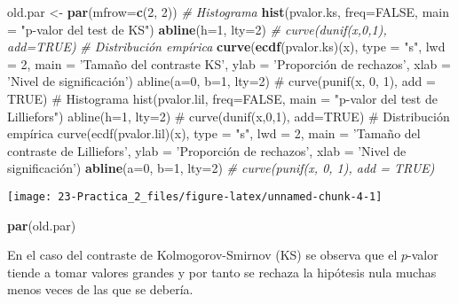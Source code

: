 \documentclass[
]{book}
\newenvironment{Shaded}{\begin{snugshade}}{\end{snugshade}}
\newcommand{\CommentTok}[1]{\textcolor[rgb]{0.56,0.35,0.01}{\textit{#1}}}
\newcommand{\DataTypeTok}[1]{\textcolor[rgb]{0.13,0.29,0.53}{#1}}
\newcommand{\DecValTok}[1]{\textcolor[rgb]{0.00,0.00,0.81}{#1}}
\newcommand{\KeywordTok}[1]{\textcolor[rgb]{0.13,0.29,0.53}{\textbf{#1}}}
\newcommand{\NormalTok}[1]{#1}
\newcommand{\OtherTok}[1]{\textcolor[rgb]{0.56,0.35,0.01}{#1}}
\newcommand{\StringTok}[1]{\textcolor[rgb]{0.31,0.60,0.02}{#1}}
\theoremstyle{definition}
\theoremstyle{definition}
\theoremstyle{definition}
\theoremstyle{remark}
\begin{document}
\begin{Shaded}
\begin{Highlighting}[]
\NormalTok{old.par <-}\StringTok{ }\KeywordTok{par}\NormalTok{(}\DataTypeTok{mfrow=}\KeywordTok{c}\NormalTok{(}\DecValTok{2}\NormalTok{, }\DecValTok{2}\NormalTok{))}
\CommentTok{# Histograma}
\KeywordTok{hist}\NormalTok{(pvalor.ks, }\DataTypeTok{freq=}\OtherTok{FALSE}\NormalTok{, }\DataTypeTok{main =} \StringTok{"p-valor del test de KS"}\NormalTok{)}
\KeywordTok{abline}\NormalTok{(}\DataTypeTok{h=}\DecValTok{1}\NormalTok{, }\DataTypeTok{lty=}\DecValTok{2}\NormalTok{)   }\CommentTok{# curve(dunif(x,0,1), add=TRUE)}
\CommentTok{# Distribución empírica}
\KeywordTok{curve}\NormalTok{(}\KeywordTok{ecdf}\NormalTok{(pvalor.ks)(x), }\DataTypeTok{type =} \StringTok{"s"}\NormalTok{, }\DataTypeTok{lwd =} \DecValTok{2}\NormalTok{, }
      \DataTypeTok{main =} \StringTok{'Tamaño del contraste KS'}\NormalTok{, }\DataTypeTok{ylab =} \StringTok{'Proporción de rechazos'}\NormalTok{, }
      \DataTypeTok{xlab =} \StringTok{'Nivel de significación')}
\StringTok{abline(a=0, b=1, lty=2)   # curve(punif(x, 0, 1), add = TRUE)}
\StringTok{# Histograma}
\StringTok{hist(pvalor.lil, freq=FALSE, main = "p-valor del test de Lilliefors")}
\StringTok{abline(h=1, lty=2)   # curve(dunif(x,0,1), add=TRUE)}
\StringTok{# Distribución empírica}
\StringTok{curve(ecdf(pvalor.lil)(x), type = "s", lwd = 2, }
\StringTok{      main = '}\NormalTok{Tamaño del contraste de Lilliefors}\StringTok{', ylab = '}\NormalTok{Proporción de rechazos}\StringTok{', }
\StringTok{      xlab = '}\NormalTok{Nivel de significación')}
\KeywordTok{abline}\NormalTok{(}\DataTypeTok{a=}\DecValTok{0}\NormalTok{, }\DataTypeTok{b=}\DecValTok{1}\NormalTok{, }\DataTypeTok{lty=}\DecValTok{2}\NormalTok{)   }\CommentTok{# curve(punif(x, 0, 1), add = TRUE)}
\end{Highlighting}
\end{Shaded}

\begin{center}\texttt{[image: 23-Practica\_2\_files/figure-latex/unnamed-chunk-4-1]} \end{center}

\begin{Shaded}
\begin{Highlighting}[]
\KeywordTok{par}\NormalTok{(old.par)}
\end{Highlighting}
\end{Shaded}

En el caso del contraste de Kolmogorov-Smirnov (KS) se observa que el \(p\)-valor
tiende a tomar valores grandes y por tanto se rechaza la hipótesis nula
muchas menos veces de las que se debería.
\end{document}
